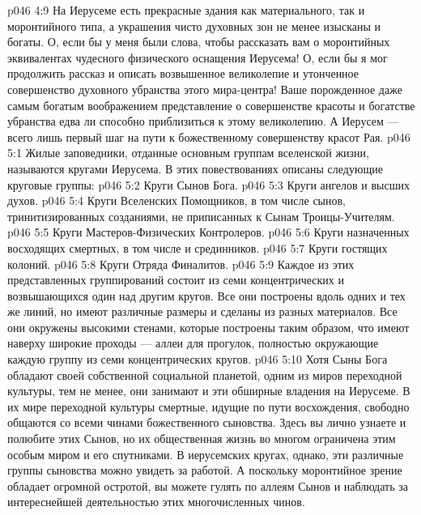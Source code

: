 \vs p046 4:9 На Иерусеме есть прекрасные здания как материального, так и моронтийного типа, а украшения чисто духовных зон не менее изысканы и богаты. О, если бы у меня были слова, чтобы рассказать вам о моронтийных эквивалентах чудесного физического оснащения Иерусема! О, если бы я мог продолжить рассказ и описать возвышенное великолепие и утонченное совершенство духовного убранства этого мира\hyp{}центра! Ваше порожденное даже самым богатым воображением представление о совершенстве красоты и богатстве убранства едва ли способно приблизиться к этому великолепию. А Иерусем --- всего лишь первый шаг на пути к божественному совершенству красот Рая.
\vs p046 5:1 Жилые заповедники, отданные основным группам вселенской жизни, называются кругами Иерусема. В этих повествованиях описаны следующие круговые группы:
\vs p046 5:2 \bibnobreakspace Круги Сынов Бога.
\vs p046 5:3 \bibnobreakspace Круги ангелов и высших духов.
\vs p046 5:4 \bibnobreakspace Круги Вселенских Помощников, в том числе сынов, тринитизированных созданиями, не приписанных к Сынам Троицы\hyp{}Учителям.
\vs p046 5:5 \bibnobreakspace Круги Мастеров\hyp{}Физических Контролеров.
\vs p046 5:6 \bibnobreakspace Круги назначенных восходящих смертных, в том числе и срединников.
\vs p046 5:7 \bibnobreakspace Круги гостящих колоний.
\vs p046 5:8 \bibnobreakspace Круги Отряда Финалитов.
\vs p046 5:9 \pc Каждое из этих представленных группирований состоит из семи концентрических и возвышающихся один над другим кругов. Все они построены вдоль одних и тех же линий, но имеют различные размеры и сделаны из разных материалов. Все они окружены высокими стенами, которые построены таким образом, что имеют наверху широкие проходы --- аллеи для прогулок, полностью окружающие каждую группу из семи концентрических кругов.
\vs p046 5:10 \pc {}\bibnobreakspace {} Хотя Сыны Бога обладают своей собственной социальной планетой, одним из миров переходной культуры, тем не менее, они занимают и эти обширные владения на Иерусеме. В их мире переходной культуры смертные, идущие по пути восхождения, свободно общаются со всеми чинами божественного сыновства. Здесь вы лично узнаете и полюбите этих Сынов, но их общественная жизнь во многом ограничена этим особым миром и его спутниками. В иерусемских кругах, однако, эти различные группы сыновства можно увидеть за работой. А поскольку моронтийное зрение обладает огромной остротой, вы можете гулять по аллеям Сынов и наблюдать за интереснейшей деятельностью этих многочисленных чинов.
